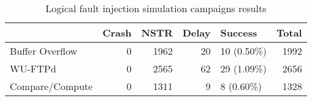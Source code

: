 \begin{table}[H]
\centering
\caption{Logical fault injection simulation campaigns results}
\label{table:end_sim_by_status_hamming_multi_bitflip_reg}
\begin{tabular}{lrrrlr}
\toprule
 & Crash & NSTR & Delay & Success & Total \\
\midrule
Buffer Overflow & 0 & 1962 & 20 & 10 (0.50\%) & 1992 \\
WU-FTPd & 0 & 2565 & 62 & 29 (1.09\%) & 2656 \\
Compare/Compute & 0 & 1311 & 9 & 8 (0.60\%) & 1328 \\
\bottomrule
\end{tabular}
\end{table}
